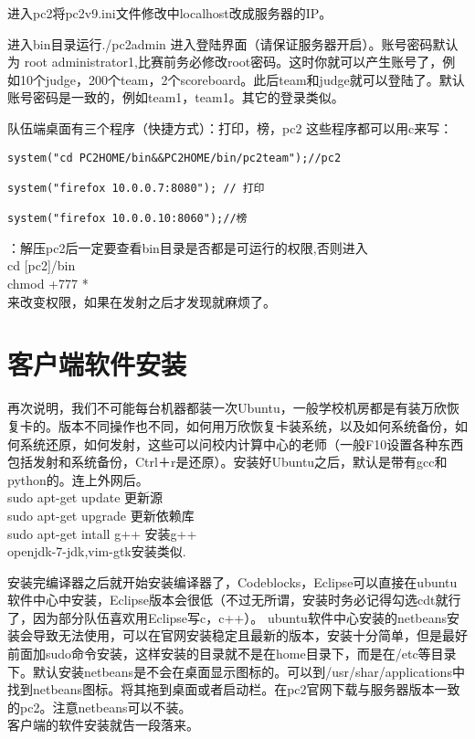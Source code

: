\documentclass[12pt]{article}
\begin{document}
进入pc2将pc2v9.ini文件修改中localhost改成服务器的IP。

进入bin目录运行./pc2admin 进入登陆界面（请保证服务器开启）。账号密码默认为 root administrator1,比赛前务必修改root密码。这时你就可以产生账号了，例如10个judge，200个team，2个scoreboard。此后team和judge就可以登陆了。默认账号密码是一致的，例如team1，team1。其它的登录类似。

队伍端桌面有三个程序（快捷方式）：打印，榜，pc2
这些程序都可以用c来写：
\begin{verbatim}
system("cd PC2HOME/bin&&PC2HOME/bin/pc2team");//pc2

system("firefox 10.0.0.7:8080"); // 打印

system("firefox 10.0.0.10:8060");//榜
\end{verbatim}
{\color{green}{特别:}}：解压pc2后一定要查看bin目录是否都是可运行的权限,否则进入 \\
cd [pc2]/bin  \\
chmod +777 * \\
来改变权限，如果在发射之后才发现就麻烦了。



\section{客户端软件安装}
再次说明，我们不可能每台机器都装一次Ubuntu，一般学校机房都是有装万欣恢复卡的。版本不同操作也不同，如何用万欣恢复卡装系统，以及如何系统备份，如何系统还原，如何发射，这些可以问校内计算中心的老师（一般F10设置各种东西包括发射和系统备份，Ctrl＋r是还原）。安装好Ubuntu之后，默认是带有gcc和python的。连上外网后。\\
sudo apt-get update 更新源 \\
sudo apt-get upgrade 更新依赖库 \\
sudo apt-get intall g++ 安装g++ \\
openjdk-7-jdk,vim-gtk安装类似.

安装完编译器之后就开始安装编译器了，Codeblocks，Eclipse可以直接在ubuntu软件中心中安装，Eclipse版本会很低（不过无所谓，安装时务必记得勾选cdt就行了，因为部分队伍喜欢用Eclipse写c，c++）。
ubuntu软件中心安装的netbeans安装会导致无法使用，可以在官网安装稳定且最新的版本，安装十分简单，但是最好前面加sudo命令安装，这样安装的目录就不是在home目录下，而是在/etc等目录下。默认安装netbeans是不会在桌面显示图标的。可以到/usr/shar/applications中找到netbeans图标。将其拖到桌面或者启动栏。在pc2官网下载与服务器版本一致的pc2。注意netbeans可以不装。\\	
客户端的软件安装就告一段落来。
\end{document}
